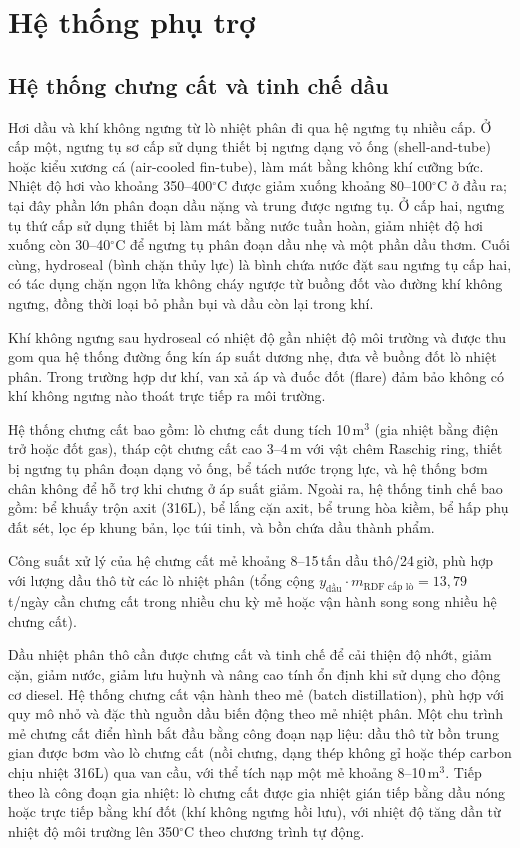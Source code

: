 \documentclass[../main.tex]{subfiles}
\begin{document}
\section{Hệ thống phụ trợ}
\subsection{Hệ thống chưng cất và tinh chế dầu}
\label{sec:chung-cat-tinh-che}

Hơi dầu và khí không ngưng từ lò nhiệt phân đi qua hệ ngưng tụ nhiều cấp. Ở cấp một, ngưng tụ sơ cấp sử dụng thiết bị ngưng dạng vỏ ống (shell-and-tube) hoặc kiểu xương cá (air-cooled fin-tube), làm mát bằng không khí cưỡng bức. Nhiệt độ hơi vào khoảng 350--400$^\circ\mathrm{C}$ được giảm xuống khoảng 80--100$^\circ\mathrm{C}$ ở đầu ra; tại đây phần lớn phân đoạn dầu nặng và trung được ngưng tụ. Ở cấp hai, ngưng tụ thứ cấp sử dụng thiết bị làm mát bằng nước tuần hoàn, giảm nhiệt độ hơi xuống còn 30--40$^\circ\mathrm{C}$ để ngưng tụ phân đoạn dầu nhẹ và một phần dầu thơm. Cuối cùng, hydroseal (bình chặn thủy lực) là bình chứa nước đặt sau ngưng tụ cấp hai, có tác dụng chặn ngọn lửa không cháy ngược từ buồng đốt vào đường khí không ngưng, đồng thời loại bỏ phần bụi và dầu còn lại trong khí.

Khí không ngưng sau hydroseal có nhiệt độ gần nhiệt độ môi trường và được thu gom qua hệ thống đường ống kín áp suất dương nhẹ, đưa về buồng đốt lò nhiệt phân. Trong trường hợp dư khí, van xả áp và đuốc đốt (flare) đảm bảo không có khí không ngưng nào thoát trực tiếp ra môi trường.

Hệ thống chưng cất bao gồm: lò chưng cất dung tích 10\,m$^3$ (gia nhiệt bằng điện trở hoặc đốt gas), tháp cột chưng cất cao 3--4\,m với vật chêm Raschig ring, thiết bị ngưng tụ phân đoạn dạng vỏ ống, bể tách nước trọng lực, và hệ thống bơm chân không để hỗ trợ khi chưng ở áp suất giảm. Ngoài ra, hệ thống tinh chế bao gồm: bể khuấy trộn axit (316L), bể lắng cặn axit, bể trung hòa kiềm, bể hấp phụ đất sét, lọc ép khung bản, lọc túi tinh, và bồn chứa dầu thành phẩm.

Công suất xử lý của hệ chưng cất mẻ khoảng 8--15\,tấn dầu thô/24\,giờ, phù hợp với lượng dầu thô từ các lò nhiệt phân (tổng cộng $y_{\text{dầu}} \cdot m_{\text{RDF cấp lò}} = 13{,}79$ t/ngày cần chưng cất trong nhiều chu kỳ mẻ hoặc vận hành song song nhiều hệ chưng cất).

Dầu nhiệt phân thô cần được chưng cất và tinh chế để cải thiện độ nhớt, giảm cặn, giảm nước, giảm lưu huỳnh và nâng cao tính ổn định khi sử dụng cho động cơ diesel. Hệ thống chưng cất vận hành theo mẻ (batch distillation), phù hợp với quy mô nhỏ và đặc thù nguồn dầu biến động theo mẻ nhiệt phân. Một chu trình mẻ chưng cất điển hình bắt đầu bằng công đoạn nạp liệu: dầu thô từ bồn trung gian được bơm vào lò chưng cất (nồi chưng, dạng thép không gỉ hoặc thép carbon chịu nhiệt 316L) qua van cầu, với thể tích nạp một mẻ khoảng 8--10\,m$^3$. Tiếp theo là công đoạn gia nhiệt: lò chưng cất được gia nhiệt gián tiếp bằng dầu nóng hoặc trực tiếp bằng khí đốt (khí không ngưng hồi lưu), với nhiệt độ tăng dần từ nhiệt độ môi trường lên 350$^\circ\mathrm{C}$ theo chương trình tự động.
\end{document}

